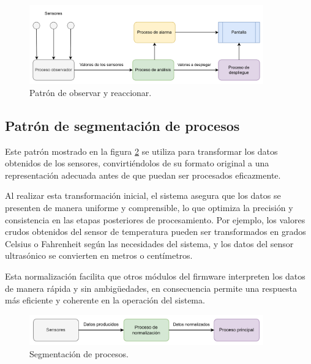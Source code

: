 \vspace{1cm}
\begin{figure}[htbp]
	\centering
	\includegraphics[width=0.9\textwidth, height=0.25\textheight]{./Figures/patron_de_observar_y_reaccionar.png}
	\caption{Patrón de observar y reaccionar.}
	\label{fig:patron_de_observar_y_reaccionar}
\end{figure}
\vspace{1cm}

\subsection{Patrón de segmentación de procesos}

Este patrón mostrado en la figura \ref{fig:segmentacion_de_procesos} se utiliza para transformar los datos obtenidos de los sensores, convirtiéndolos de su formato original a una representación adecuada antes de que puedan ser procesados eficazmente. 

Al realizar esta transformación inicial, el sistema asegura que los datos se presenten de manera uniforme y comprensible, lo que optimiza la precisión y consistencia en las etapas posteriores de procesamiento. Por ejemplo, los valores crudos obtenidos del sensor de temperatura pueden ser transformados en grados Celsius o Fahrenheit según las necesidades del sistema, y los datos del sensor ultrasónico se convierten en metros o centímetros. 

Esta normalización facilita que otros módulos del firmware interpreten los datos de manera rápida y sin ambigüedades, en consecuencia permite una respuesta más eficiente y coherente en la operación del sistema.

\vspace{1cm}
\begin{figure}[htbp]
	\centering
	\includegraphics[width=0.9\textwidth, height=0.1\textheight]{./Figures/segmentacion_de_procesos.png}
	\caption{Segmentación de procesos.}
	\label{fig:segmentacion_de_procesos}
\end{figure}
\vspace{1cm}

